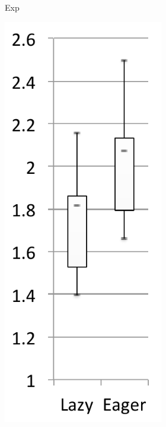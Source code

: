 \documentclass[sigplan,10pt,review,anonymous]{acmart}\settopmatter{printfolios=true,printccs=false,printacmref=false}
\begin{document}
\begin{figure}[bth]
\begin{subfigure}[b]{.48\textwidth}
\begin{subfigure}[b]{.24\textwidth}
    		\caption{Exp}
       	\end{subfigure}	
    	\begin{subfigure}[b]{.24\textwidth}
    		\includegraphics[width=\linewidth]{figures/wildflyExpCache} 

\end{subfigure}
\end{subfigure}
\end{figure}
\end{document}
